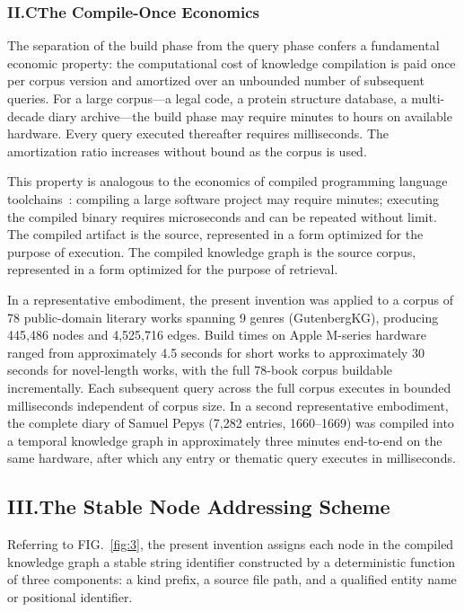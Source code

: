 \documentclass[12pt]{article}
\begin{document}
\subsubsection{II.C\quad The Compile-Once Economics}

The separation of the build phase from the query phase confers a fundamental
economic property: the computational cost of knowledge compilation is paid once
per corpus version and amortized over an unbounded number of subsequent queries.
For a large corpus---a legal code, a protein structure database, a multi-decade
diary archive---the build phase may require minutes to hours on available
hardware. Every query executed thereafter requires milliseconds. The amortization
ratio increases without bound as the corpus is used.

This property is analogous to the economics of compiled programming language
toolchains~\cite{aho2006compilers}: compiling a large software project may
require minutes; executing the compiled binary requires microseconds and can be
repeated without limit. The compiled artifact is the source, represented in a
form optimized for the purpose of execution. The compiled knowledge graph is the
source corpus, represented in a form optimized for the purpose of retrieval.

In a representative embodiment, the present invention was applied to a corpus of
78 public-domain literary works spanning 9 genres (GutenbergKG), producing
445,486 nodes and 4,525,716 edges. Build times on Apple M-series hardware ranged
from approximately 4.5 seconds for short works to approximately 30 seconds for
novel-length works, with the full 78-book corpus buildable incrementally. Each
subsequent query across the full corpus executes in bounded milliseconds
independent of corpus size. In a second representative embodiment, the complete
diary of Samuel Pepys (7,282 entries, 1660--1669) was compiled into a temporal
knowledge graph in approximately three minutes end-to-end on the same hardware,
after which any entry or thematic query executes in milliseconds.

\subsection{III.\quad The Stable Node Addressing Scheme}

Referring to FIG.~\ref{fig:3}, the present invention assigns each node in the
compiled knowledge graph a stable string identifier constructed by a
deterministic function of three components: a kind prefix, a source file path,
and a qualified entity name or positional identifier.
\end{document}
